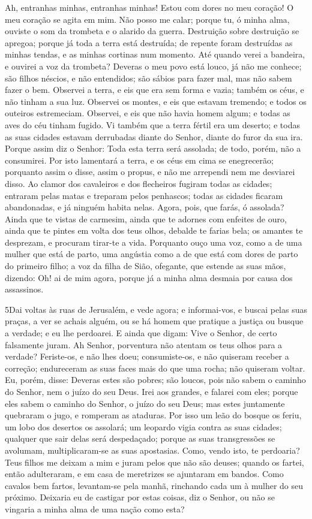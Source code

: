 Ah, entranhas minhas, entranhas minhas! Estou com dores no meu
coração! O meu coração se agita em mim. Não posso me calar; porque
tu, ó minha alma, ouviste o som da trombeta e o alarido da guerra.
Destruição sobre destruição se apregoa; porque já toda a
terra está destruída; de repente foram destruídas as minhas tendas,
e as minhas cortinas num momento. Até quando verei a
bandeira, e ouvirei a voz da trombeta? Deveras o meu povo
está louco, já não me conhece; são filhos néscios, e não entendidos;
são sábios para fazer mal, mas não sabem fazer o bem.
Observei a terra, e eis que era sem forma e vazia; também os
céus, e não tinham a sua luz. Observei os montes, e eis que
estavam tremendo; e todos os outeiros estremeciam. Observei,
e eis que não havia homem algum; e todas as aves do céu tinham
fugido. Vi também que a terra fértil era um deserto; e todas
as suas cidades estavam derrubadas diante do Senhor, diante do furor
da sua ira. Porque assim diz o Senhor: Toda esta terra será
assolada; de todo, porém, não a consumirei. Por isto
lamentará a terra, e os céus em cima se enegrecerão; porquanto assim
o disse, assim o propus, e não me arrependi nem me desviarei disso.
Ao clamor dos cavaleiros e dos flecheiros fugiram todas as
cidades; entraram pelas matas e treparam pelos penhascos; todas as
cidades ficaram abandonadas, e já ninguém habita nelas.
Agora, pois, que farás, ó assolada? Ainda que te vistas de
carmesim, ainda que te adornes com enfeites de ouro, ainda que te
pintes em volta dos teus olhos, debalde te farias bela; os amantes
te desprezam, e procuram tirar-te a vida. Porquanto ouço uma
voz, como a de uma mulher que está de parto, uma angústia como a de
que está com dores de parto do primeiro filho; a voz da filha de
Sião, ofegante, que estende as suas mãos, dizendo: Oh! ai de mim
agora, porque já a minha alma desmaia por causa dos assassinos.

\medskip

\lettrine{5} Dai voltas às ruas de Jerusalém, e vede agora; e
informai-vos, e buscai pelas suas praças, a ver se achais alguém, ou
se há homem que pratique a justiça ou busque a verdade; e eu lhe
perdoarei. E ainda que digam: Vive o Senhor, de certo falsamente
juram. Ah Senhor, porventura não atentam os teus olhos para a
verdade? Feriste-os, e não lhes doeu; consumiste-os, e não quiseram
receber a correção; endureceram as suas faces mais do que uma rocha;
não quiseram voltar. Eu, porém, disse: Deveras estes são pobres;
são loucos, pois não sabem o caminho do Senhor, nem o juízo do seu
Deus. Irei aos grandes, e falarei com eles; porque eles sabem o
caminho do Senhor, o juízo do seu Deus; mas estes juntamente
quebraram o jugo, e romperam as ataduras. Por isso um leão do
bosque os feriu, um lobo dos desertos os assolará; um leopardo vigia
contra as suas cidades; qualquer que sair delas será despedaçado;
porque as suas transgressões se avolumam, multiplicaram-se as suas
apostasias. Como, vendo isto, te perdoaria? Teus filhos me
deixam a mim e juram pelos que não são deuses; quando os fartei,
então adulteraram, e em casa de meretrizes se ajuntaram em bandos.
Como cavalos bem fartos, levantam-se pela manhã, rinchando cada
um à mulher do seu próximo. Deixaria eu de castigar por estas
coisas, diz o Senhor, ou não se vingaria a minha alma de uma nação
como esta?

